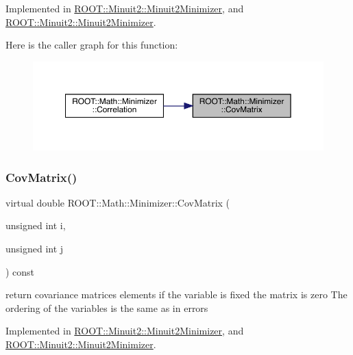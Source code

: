 Implemented in \mbox{\hyperlink{classROOT_1_1Minuit2_1_1Minuit2Minimizer_a6ba10de01ab6e7228fa4908894de5619}{R\+O\+O\+T\+::\+Minuit2\+::\+Minuit2\+Minimizer}}, and \mbox{\hyperlink{classROOT_1_1Minuit2_1_1Minuit2Minimizer_a6ba10de01ab6e7228fa4908894de5619}{R\+O\+O\+T\+::\+Minuit2\+::\+Minuit2\+Minimizer}}.

Here is the caller graph for this function\+:\nopagebreak
\begin{figure}[H]
\begin{center}
\leavevmode
\includegraphics[width=350pt]{dc/dc4/classROOT_1_1Math_1_1Minimizer_a01b0ec371972dab12ca3b9c962d952f8_icgraph}
\end{center}
\end{figure}
\mbox{\label{classROOT_1_1Math_1_1Minimizer_a01b0ec371972dab12ca3b9c962d952f8}} 
\subsubsection{\texorpdfstring{CovMatrix()}{CovMatrix()}\hspace{0.1cm}{\footnotesize\ttfamily [2/2]}}
{\footnotesize\ttfamily virtual double R\+O\+O\+T\+::\+Math\+::\+Minimizer\+::\+Cov\+Matrix (\begin{DoxyParamCaption}\item[{unsigned int}]{i,  }\item[{unsigned int}]{j }\end{DoxyParamCaption}) const\hspace{0.3cm}{\ttfamily [pure virtual]}}

return covariance matrices elements if the variable is fixed the matrix is zero The ordering of the variables is the same as in errors 

Implemented in \mbox{\hyperlink{classROOT_1_1Minuit2_1_1Minuit2Minimizer_a6ba10de01ab6e7228fa4908894de5619}{R\+O\+O\+T\+::\+Minuit2\+::\+Minuit2\+Minimizer}}, and \mbox{\hyperlink{classROOT_1_1Minuit2_1_1Minuit2Minimizer_a6ba10de01ab6e7228fa4908894de5619}{R\+O\+O\+T\+::\+Minuit2\+::\+Minuit2\+Minimizer}}.

